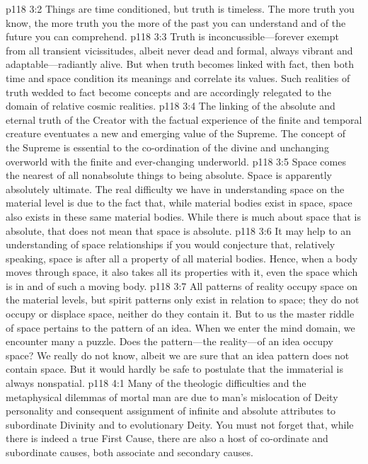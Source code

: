 \pc \vs p118 3:2 Things are time conditioned, but truth is timeless. The more truth you know, the more truth you  the more of the past you can understand and of the future you can comprehend.
\vs p118 3:3 Truth is inconcussible---forever exempt from all transient vicissitudes, albeit never dead and formal, always vibrant and adaptable---radiantly alive. But when truth becomes linked with fact, then both time and space condition its meanings and correlate its values. Such realities of truth wedded to fact become concepts and are accordingly relegated to the domain of relative cosmic realities.
\vs p118 3:4 The linking of the absolute and eternal truth of the Creator with the factual experience of the finite and temporal creature eventuates a new and emerging value of the Supreme. The concept of the Supreme is essential to the co\hyp{}ordination of the divine and unchanging overworld with the finite and ever\hyp{}changing underworld.
\pc \vs p118 3:5 Space comes the nearest of all nonabsolute things to being absolute. Space is apparently absolutely ultimate. The real difficulty we have in understanding space on the material level is due to the fact that, while material bodies exist in space, space also exists in these same material bodies. While there is much about space that is absolute, that does not mean that space is absolute.
\vs p118 3:6 It may help to an understanding of space relationships if you would conjecture that, relatively speaking, space is after all a property of all material bodies. Hence, when a body moves through space, it also takes all its properties with it, even the space which is in and of such a moving body.
\vs p118 3:7 All patterns of reality occupy space on the material levels, but spirit patterns only exist in relation to space; they do not occupy or displace space, neither do they contain it. But to us the master riddle of space pertains to the pattern of an idea. When we enter the mind domain, we encounter many a puzzle. Does the pattern---the reality---of an idea occupy space? We really do not know, albeit we are sure that an idea pattern does not contain space. But it would hardly be safe to postulate that the immaterial is always nonspatial.\plusone
{}
\vs p118 4:1 Many of the theologic difficulties and the metaphysical dilemmas of mortal man are due to man’s mislocation of Deity personality and consequent assignment of infinite and absolute attributes to subordinate Divinity and to evolutionary Deity. You must not forget that, while there is indeed a true First Cause, there are also a host of co\hyp{}ordinate and subordinate causes, both associate and secondary causes.
